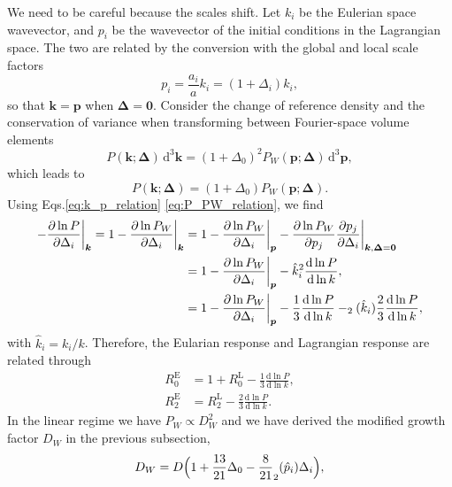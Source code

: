 \documentclass[a4paper,11pt]{article}
\let\L\relax
\DeclareMathOperator{\L}{\mathcal{L}}
\renewcommand{\d}{\mathrm{d}}
\newcommand{\vk}{{\bm k}}
\newcommand{\vp}{{\bm p}}
\newcommand{\vDelta}{{\bm\Delta}}
\newcommand{\Euler}{\mathrm{E}}
\newcommand{\Lagrange}{\mathrm{L}}
\begin{document}
We need to be careful because the scales shift.
Let $k_i$ be the Eulerian space wavevector, and $p_i$ be the wavevector of the
initial conditions in the Lagrangian space.
The two are related by the conversion with the global and local scale factors
\begin{equation}
    p_i = \frac{a_i}a k_i = (1 + \Delta_i) k_i,
    \label{eq:k_p_relation}
\end{equation}
so that $\vk = \vp$ when $\vDelta = \bm0$.
Consider the change of reference density and the conservation of variance when
transforming between Fourier-space volume elements
\begin{equation}
    P (\vk;\vDelta)\,\d^3\vk = (1 + \Delta_0)^2 P_W(\vp;\vDelta) \,\d^3\vp,
\end{equation}
which leads to
\begin{equation}
    P (\vk;\vDelta)= (1 + \Delta_0) P_W(\vp;\vDelta).
    \label{eq:P_PW_relation}
\end{equation}
Using Eqs.\eqref{eq:k_p_relation} \eqref{eq:P_PW_relation}, we find
\begin{align}
    - \frac{\partial\ln P}{\partial\Delta_i} \bigg|_\vk
    = 1 - \frac{\partial\ln P_W}{\partial\Delta_i} \bigg|_\vk
    &= 1 - \frac{\partial\ln P_W}{\partial\Delta_i} \bigg|_\vp
    - \frac{\partial\ln P_W}{\partial p_j}
        \frac{\partial p_j}{\partial \Delta_i} \bigg|_{\vk, \vDelta=\bm0}
    \nonumber\\
    &= 1 - \frac{\partial\ln P_W}{\partial\Delta_i} \bigg|_\vp
    - \hat k_i^2 \frac{\d\ln P}{\d\ln k}, \nonumber\\
    &= 1 - \frac{\partial\ln P_W}{\partial\Delta_i} \bigg|_\vp
    - \frac13 \frac{\d\ln P}{\d\ln k}
    - \L_2(\hat k_i) \frac23 \frac{\d\ln P}{\d\ln k},
\end{align}
with $\hat k_i = k_i / k$.
Therefore, the Eularian response and Lagrangian response are related through
\begin{align}
    R^\Euler_0 &= 1 + R^\Lagrange_0 - \frac13 \frac{\d\ln P}{\d\ln k},
    \nonumber\\
    R^\Euler_2 &= R^\Lagrange_2 - \frac23 \frac{\d\ln P}{\d\ln k}.
\end{align}
In the linear regime we have $P_W \propto D_W^2$ and we have derived the modified growth factor $D_W$ in the previous subsection,
\begin{equation}
    D_W = D \Bigl( 1 + \frac{13}{21} \Delta_0
    - \frac8{21} \L_2(\hat p_i) \Delta_i \Bigr),
    \label{DW}
\end{equation}
\end{document}
